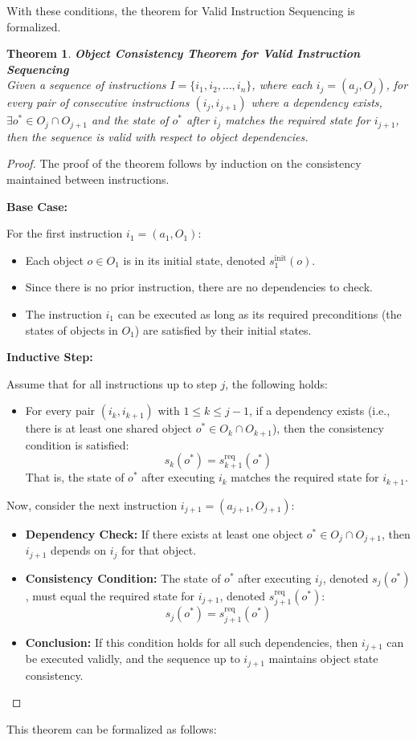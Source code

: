 \documentclass[a4paper,11pt]{lmcs}
\newtheorem{theorem}{Theorem}
\begin{document}
With these conditions, the theorem for Valid Instruction Sequencing is formalized.
\begin{theorem}
\textbf{Object Consistency Theorem for Valid Instruction Sequencing}
\\
Given a sequence of instructions \( I = \{i_1, i_2, \ldots, i_n\} \), where each \( i_j = (a_j, O_j) \),
for every pair of consecutive instructions \( (i_j, i_{j+1}) \) where a dependency exists, $\exists o^* \in O_j \cap O_{j+1}$
and the state of $ o^*$  after $i_j$ matches the required state for $i_{j+1}$, then the sequence is valid with respect to object dependencies.
\end{theorem}
\begin{proof}

The proof of the theorem follows by induction on the consistency maintained between instructions.

\textbf{Base Case:}

For the first instruction $i_1 = (a_1, O_1)$:
\begin{itemize}
    \item Each object $o \in O_1$ is in its initial state, denoted $s_1^{\mathrm{init}}(o)$.
    \item Since there is no prior instruction, there are no dependencies to check.
    \item The instruction $i_1$ can be executed as long as its required preconditions (the states of objects in $O_1$) are satisfied by their initial states.
\end{itemize}

\textbf{Inductive Step:}

Assume that for all instructions up to step $j$, the following holds:
\begin{itemize}
    \item For every pair $(i_k, i_{k+1})$ with $1 \leq k \leq j-1$, if a dependency exists (i.e., there is at least one shared object $o^* \in O_k \cap O_{k+1}$), then the consistency condition is satisfied:
    \[
    s_k(o^*) = s_{k+1}^{\mathrm{req}}(o^*)
    \]
    That is, the state of $o^*$ after executing $i_k$ matches the required state for $i_{k+1}$.
\end{itemize}

Now, consider the next instruction $i_{j+1} = (a_{j+1}, O_{j+1})$:
\begin{itemize}
    \item \textbf{Dependency Check:} If there exists at least one object $o^* \in O_j \cap O_{j+1}$, then $i_{j+1}$ depends on $i_j$ for that object.
    \item \textbf{Consistency Condition:} The state of $o^*$ after executing $i_j$, denoted $s_j(o^*)$, must equal the required state for $i_{j+1}$, denoted $s_{j+1}^{\mathrm{req}}(o^*)$:
    \[
    s_j(o^*) = s_{j+1}^{\mathrm{req}}(o^*)
    \]
    \item \textbf{Conclusion:} If this condition holds for all such dependencies, then $i_{j+1}$ can be executed validly, and the sequence up to $i_{j+1}$ maintains object state consistency.
\end{itemize}
\end{proof}
This theorem can be formalized as follows:
\end{document}
